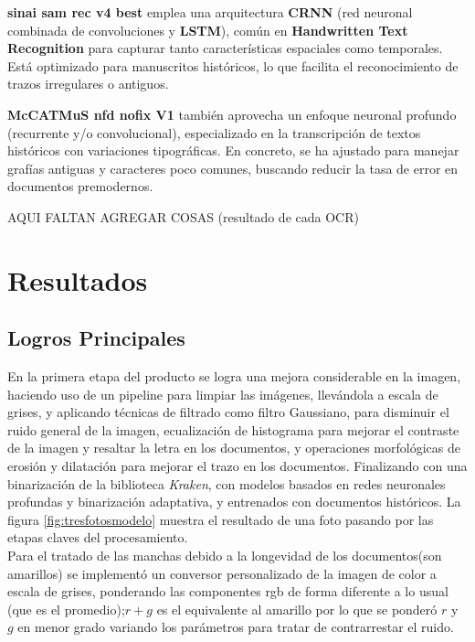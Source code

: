 \documentclass[11pt,a4paper]{article}
\begin{document}
\textbf{sinai sam rec v4 best} emplea una arquitectura \textbf{CRNN} (red neuronal combinada de convoluciones y \textbf{LSTM}), común en \textbf{Handwritten Text Recognition} para capturar tanto características espaciales como temporales. Está optimizado para manuscritos históricos, lo que facilita el reconocimiento de trazos irregulares o antiguos.

\textbf{McCATMuS nfd nofix V1} también aprovecha un enfoque neuronal profundo (recurrente y/o convolucional), especializado en la transcripción de textos históricos con variaciones tipográficas. En concreto, se ha ajustado para manejar grafías antiguas y caracteres poco comunes, buscando reducir la tasa de error en documentos premodernos.

AQUI FALTAN AGREGAR COSAS (resultado de cada OCR)\\

\section{Resultados} 
\subsection{Logros Principales} 

En la primera etapa del producto se logra una mejora considerable en la imagen, haciendo uso de un pipeline para limpiar las im\'agenes, llev\'andola a escala de grises, y aplicando t\'ecnicas de filtrado como filtro Gaussiano, para disminuir el ruido general de la imagen, ecualización de histograma para mejorar el contraste de la imagen y resaltar la letra en los documentos, y operaciones morfológicas de erosión y dilatación para mejorar el trazo en los documentos. Finalizando con una binarización de la biblioteca \textit{Kraken}, con modelos basados en redes neuronales profundas y binarización adaptativa, y entrenados con documentos históricos. La figura \ref{fig:tresfotosmodelo} muestra el resultado de una foto pasando por las etapas claves del procesamiento.\\

Para el tratado de las manchas debido a la longevidad de los documentos(son amarillos) se implement\'o un conversor personalizado de la imagen de color a escala de grises, ponderando las componentes rgb de forma diferente a lo usual (que es el promedio);$r + g$ es el equivalente al amarillo por lo que se ponderó $r$ y $g$ en menor grado variando los par\'ametros para tratar de contrarrestar el ruido.
\end{document}
